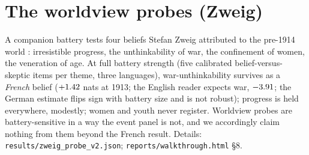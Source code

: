 \documentclass[11pt]{article}
\begin{document}
\section{The worldview probes (Zweig)}\label{app:zweig}
A companion battery tests four beliefs Stefan Zweig attributed to the pre-1914 world \citep{zweig1942}:
irresistible progress, the unthinkability of war, the confinement of women, the veneration of age. At full
battery strength (five calibrated belief-versus-skeptic items per theme, three languages), war-unthinkability
survives as a \emph{French} belief ($+1.42$ nats at 1913; the English reader expects war,
$-3.91$; the German estimate flips sign with battery size and is not robust); progress is held
everywhere, modestly; women and youth never register. Worldview probes are battery-sensitive in a way the
event panel is not, and we accordingly claim nothing from them beyond the French result. Details:
\texttt{results/zweig\_probe\_v2.json}; \texttt{reports/walkthrough.html} \S8.
\end{document}
